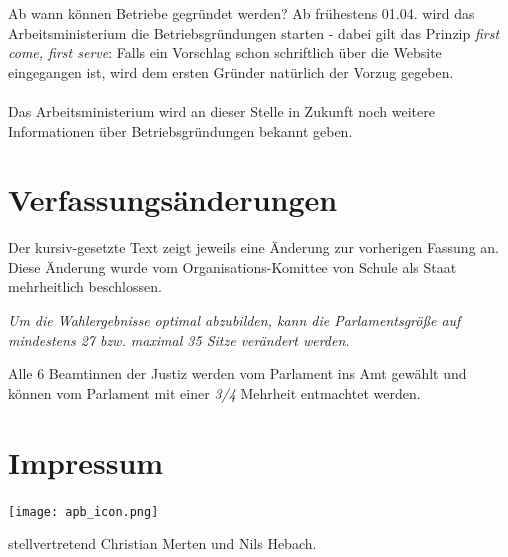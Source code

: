 \documentclass{sasbase}
\begin{document}
\begin{question}{Ab wann können Betriebe gegründet werden?}
    Ab frühestens 01.04. wird das Arbeitsministerium die Betriebsgründungen starten - dabei gilt das Prinzip \emph{first come, first serve}: 
    Falls ein Vorschlag schon schriftlich über die Website eingegangen ist, wird dem ersten Gründer natürlich der Vorzug gegeben.\\\\
    Das Arbeitsministerium wird an dieser Stelle in Zukunft noch weitere Informationen über Betriebsgründungen bekannt geben.
\end{question}

\section{Verfassungsänderungen}
Der kursiv-gesetzte Text zeigt jeweils eine Änderung zur vorherigen Fassung an. Diese Änderung wurde vom Organisations-Komittee von Schule als Staat mehrheitlich beschlossen.
    \setcounter{articleno}{18}
    \begin{article}[Wahlrecht]
        \setcounter{enumi}{5}
    \item \textit{Um die Wahlergebnisse optimal abzubilden, kann die Parlamentsgröße auf mindestens 27 bzw. maximal 35 Sitze verändert werden.}
    \end{article}
    \setcounter{articleno}{31}
    \begin{article}
    \item Alle 6 Beamtinnen der Justiz werden vom Parlament ins Amt gewählt und können vom Parlament mit einer \textit{3/4} Mehrheit entmachtet werden.
    \end{article}
\section{Impressum}
\begin{minipage}{0.4\linewidth}
\texttt{[image: apb\_icon.png]}
\end{minipage}
\begin{minipage}{0.5\linewidth}
{\raggedright stellvertretend Christian Merten und Nils Hebach.}
\end{minipage}
\end{document}
